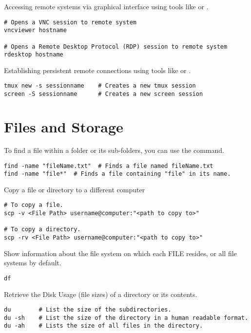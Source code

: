 Accessing remote systems via graphical interface using tools like  or .
\begin{lstlisting}
# Opens a VNC session to remote system
vncviewer hostname

# Opens a Remote Desktop Protocol (RDP) session to remote system
rdesktop hostname
\end{lstlisting}

Establishing persistent remote connections using tools like  or .
\begin{lstlisting}
tmux new -s sessionname    # Creates a new tmux session
screen -S sessionname      # Creates a new screen session
\end{lstlisting}








\section{Files and Storage}

To find a file within a folder or its sub-folders, you can use the  command.
\begin{lstlisting}
find -name "fileName.txt"  # Finds a file named fileName.txt
find -name "file*"  # Finds a file containing "file" in its name.
\end{lstlisting}

Copy a file or directory to a different computer
\begin{lstlisting}
# To copy a file.
scp -v <File Path> username@computer:"<path to copy to>"

# To copy a directory.
scp -rv <File Path> username@computer:"<path to copy to>"
\end{lstlisting}

Show information about the file system on which each FILE resides, or all file systems by default.
\begin{lstlisting}
df 
\end{lstlisting}

Retrieve the Disk Usage (file sizes) of a directory or its contents.
\begin{lstlisting}
du        # List the size of the subdirectories.
du -sh    # List the size of the directory in a human readable format.
du -ah    # Lists the size of all files in the directory.
\end{lstlisting}

